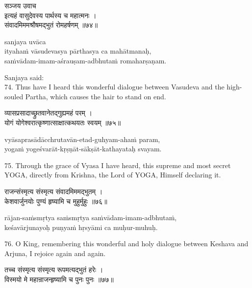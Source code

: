 \begin{gitaverse}
सञ्जय उवाच \\
इत्यहं वासुदेवस्य पार्थस्य च महात्मनः । \\
संवादमिममश्रौषमद्भुतं रोमहर्षणम् ॥७४॥
\end{gitaverse}

\begin{transliteration}
sanjaya uvāca \\
ityahaṁ vāsudevasya pārthasya ca mahātmanaḥ, \\
saṁvādam-imam-aśrauṣam-adbhutaṁ romaharṣaṇam.
\end{transliteration}

Sanjaya said: \\
74. Thus have I heard this wonderful dialogue between Vasudeva and the
high-souled Partha, which causes the hair to stand on end.

\begin{gitaverse}
व्यासप्रसादाच्छ्रुतवानेतद्गुह्यमहं परम् । \\
योगं योगेश्वरात्कृष्णात्साक्षात्कथयतः स्वयम् ॥७५॥
\end{gitaverse}

\begin{transliteration}
vyāsaprasādācchrutavān-etad-guhyam-ahaṁ param, \\
yogaṁ yogeśvarāt-kṛṣṇāt-sākṣāt-kathayataḥ svayam.
\end{transliteration}

75. Through the grace of Vyasa I have heard, this supreme and most secret YOGA,
directly from Krishna, the Lord of YOGA, Himself declaring it.

\begin{gitaverse}
राजन्संस्मृत्य संस्मृत्य संवादमिममद्भुतम् । \\
केशवार्जुनयोः पुण्यं हृष्यामि च मुहुर्मुहुः ॥७६॥
\end{gitaverse}

\begin{transliteration}
rājan-saṁsmṛtya saṁsmṛtya saṁvādam-imam-adbhutaṁ, \\
keśavārjunayoḥ puṇyaṁ hṛsyāmi ca muḥur-muhuḥ.
\end{transliteration}

76. O King, remembering this wonderful and holy dialogue between Keshava and
Arjuna, I rejoice again and again.

\begin{gitaverse}
तच्च संस्मृत्य संस्मृत्य रूपमत्यद्भुतं हरेः । \\
विस्मयो मे महान्राजन्हृष्यामि च पुनः पुनः ॥७७॥
\end{gitaverse}

